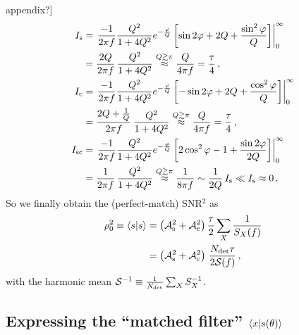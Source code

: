 \documentclass[aps,prd,onecolumn,nofootinbib,superscriptaddress,altaffilletter,floatfix]{revtex4-1}
\begin{document}
appendix?]
\begin{align}
  \label{eq:19}
  I_{\mathrm{s}} &= \left. \frac{-1}{2\pi f}\frac{Q^2}{1 + 4Q^2}e^{-\frac{\varphi}{Q}}\left[ \sin2\varphi + 2Q + \frac{\sin^2\varphi}{Q}\right]\right|_0^\infty\\
  &= \frac{2Q}{2\pi f}\,\frac{Q^2}{1+4Q^2} \stackrel{Q\gtrsim\pi}{\approx} \frac{Q}{4\pi f} = \frac{\tau}{4}\,,\\
  I_{\mathrm{c}} &= \left. \frac{-1}{2\pi f}\frac{Q^2}{1 + 4Q^2}e^{-\frac{\varphi}{Q}}\left[ -\sin2\varphi + 2Q + \frac{\cos^2\varphi}{Q}\right]\right|_0^\infty\\
  &= \frac{2Q + \frac{1}{Q}}{2\pi f}\,\frac{Q^2}{1+4Q^2} \stackrel{Q\gtrsim\pi}{\approx} \frac{Q}{4\pi f} = \frac{\tau}{4}\,,\\
  I_{\mathrm{sc}} &= \left. \frac{-1}{2\pi f}\frac{Q^2}{1 + 4Q^2}e^{-\frac{\varphi}{Q}}\left[ 2\cos^2\varphi - 1 + \frac{\sin2\varphi}{2Q}\right]\right|_0^\infty\\
  &= \frac{1}{2\pi f}\,\frac{Q^2}{1+4Q^2} \stackrel{Q\gtrsim\pi}{\approx} \frac{1}{8\pi f} \sim \frac{1}{2Q}\,I_{\mathrm{s}} \ll I_{\mathrm{s}} \approx 0\,.
\end{align}
So we finally obtain the (perfect-match) SNR$^2$ as
\begin{align}
  \label{eq:20}
  \rho_0^2 \equiv \langle s|s\rangle &= \left(\mathcal{A}_{\mathrm{s}}^2 + \mathcal{A}_{\mathrm{c}}^2\right)\frac{\tau}{2}\sum_X \frac{1}{S_X(f)}\\
  &=\left(\mathcal{A}_{\mathrm{s}}^2 + \mathcal{A}_{\mathrm{c}}^2\right)\,\frac{N_{\mathrm{det}}\tau}{2\mathcal{S}(f)}\,,
\end{align}
with the harmonic mean $\mathcal{S}^{-1} \equiv \frac{1}{N_{\mathrm{det}}}\sum_X S_X^{-1}$.


\subsection{Expressing the ``matched filter'' $\langle x|s(\theta)\rangle$}
\label{sec:computing-scalarxs}
\end{document}
